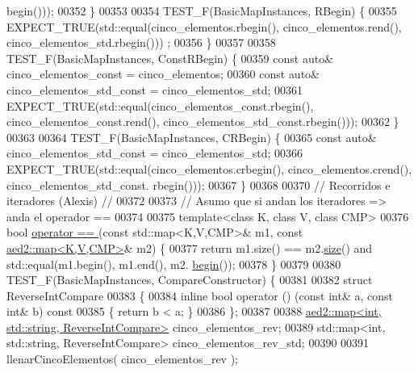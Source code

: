 \begin{DoxyCode}
      begin()));
00352 \}
00353 
00354 TEST\_F(BasicMapInstances, RBegin) \{
00355     EXPECT\_TRUE(std::equal(cinco\_elementos.rbegin(), cinco\_elementos.rend(), cinco\_elementos\_std.rbegin()))
      ;
00356 \}
00357 
00358 TEST\_F(BasicMapInstances, ConstRBegin) \{
00359     \textcolor{keyword}{const} \textcolor{keyword}{auto}& cinco\_elementos\_const = cinco\_elementos;
00360     \textcolor{keyword}{const} \textcolor{keyword}{auto}& cinco\_elementos\_std\_const = cinco\_elementos\_std;
00361     EXPECT\_TRUE(std::equal(cinco\_elementos\_const.rbegin(), cinco\_elementos\_const.rend(), 
      cinco\_elementos\_std\_const.rbegin()));
00362 \}
00363 
00364 TEST\_F(BasicMapInstances, CRBegin) \{
00365     \textcolor{keyword}{const} \textcolor{keyword}{auto}& cinco\_elementos\_std\_const = cinco\_elementos\_std;
00366     EXPECT\_TRUE(std::equal(cinco\_elementos.crbegin(), cinco\_elementos.crend(), cinco\_elementos\_std\_const.
      rbegin()));
00367 \}
00368 
00370 \textcolor{comment}{// Recorridos e iteradores (Alexis) //}
00372 \textcolor{comment}{}
00373 \textcolor{comment}{// Asumo que si andan los iteradores => anda el operador ==}
00374 
00375 \textcolor{keyword}{template}<\textcolor{keyword}{class} K, \textcolor{keyword}{class} V, \textcolor{keyword}{class} CMP>
00376 \textcolor{keywordtype}{bool} \hyperlink{classaed2_1_1map_abfc51b39670220e79037ac067006e933_abfc51b39670220e79037ac067006e933}{operator == }(\textcolor{keyword}{const} std::map<K,V,CMP>& m1, \textcolor{keyword}{const} 
      \hyperlink{classaed2_1_1map}{aed2::map<K,V,CMP>}& m2) \{
00377     \textcolor{keywordflow}{return} m1.size() == m2.\hyperlink{classaed2_1_1map_aa6e806b3be6dc0da79adbfae08b571bf_aa6e806b3be6dc0da79adbfae08b571bf}{size}() and std::equal(m1.begin(), m1.end(), m2.
      \hyperlink{classaed2_1_1map_a58a95705d54b3dda7f775ce5a22225cb_a58a95705d54b3dda7f775ce5a22225cb}{begin}());
00378 \}
00379 
00380 TEST\_F(BasicMapInstances, CompareConstructor) \{
00381 
00382     \textcolor{keyword}{struct }ReverseIntCompare
00383     \{
00384         \textcolor{keyword}{inline} \textcolor{keywordtype}{bool} operator () (\textcolor{keyword}{const} \textcolor{keywordtype}{int}& a, \textcolor{keyword}{const} \textcolor{keywordtype}{int}& b)\textcolor{keyword}{ const}
00385 \textcolor{keyword}{        }\{ \textcolor{keywordflow}{return} b < a; \}
00386     \};
00387 
00388     \hyperlink{classaed2_1_1map}{aed2::map<int, std::string, ReverseIntCompare>} 
      cinco\_elementos\_rev;
00389     std::map<int, std::string, ReverseIntCompare> cinco\_elementos\_rev\_std;
00390 
00391     llenarCincoElementos( cinco\_elementos\_rev );

\end{DoxyCode}

